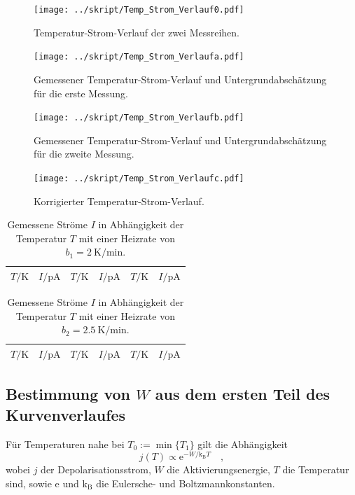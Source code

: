 \begin{figure}
\centering
\texttt{[image: ../skript/Temp\_Strom\_Verlauf0.pdf]}
\caption{Temperatur-Strom-Verlauf der zwei Messreihen.}
\label{fig:Verlauf}
\end{figure}




\begin{figure}[H]
\centering
\texttt{[image: ../skript/Temp\_Strom\_Verlaufa.pdf]}
\caption{Gemessener Temperatur-Strom-Verlauf und Untergrundabschätzung für die erste Messung.}
\label{fig:Messwertea}
\texttt{[image: ../skript/Temp\_Strom\_Verlaufb.pdf]}
\caption{Gemessener Temperatur-Strom-Verlauf und Untergrundabschätzung für die zweite Messung.}
\label{fig:Messwerteb}
\end{figure}
\begin{figure}
\centering
\texttt{[image: ../skript/Temp\_Strom\_Verlaufc.pdf]}
\caption{Korrigierter Temperatur-Strom-Verlauf.}
\label{fig:Messwertec}
\end{figure}

\begin{table}[htpb]
	\centering
	\begin{tabular}{cc|cc|cc}
		\midrule
		\midrule
		$T / \si{\kelvin}$ &
		$I / \si{\pA}$ &
		$T / \si{\kelvin}$ &
		$I / \si{\pA}$ &
		$T / \si{\kelvin}$ &
		$I / \si{\pA}$ \\
		\midrule
		
		\midrule
		\midrule
	\end{tabular}
	\caption{Gemessene Ströme $I$ in Abhängigkeit der Temperatur $T$ mit
		einer Heizrate von $b_1 = \SI{2}{\kelvin\per\minute}$.}
	\label{tab:tab1}
\end{table}
%
\begin{table}[htpb]
	\centering
	\begin{tabular}{cc|cc|cc}
		\midrule
		\midrule
		$T / \si{\kelvin}$ &
		$I / \si{\pA}$ &
		$T / \si{\kelvin}$ &
		$I / \si{\pA}$ &
		$T / \si{\kelvin}$ &
		$I / \si{\pA}$ \\
		\midrule
		
		\midrule
		\midrule
	\end{tabular}
	\caption{Gemessene Ströme $I$ in Abhängigkeit der Temperatur $T$ mit
		einer Heizrate von $b_2 = \SI{2.5}{\kelvin\per\minute}$.}
	\label{tab:tab2}
\end{table}
%
\subsection{Bestimmung von $W$ aus dem ersten Teil des Kurvenverlaufes}
Für Temperaturen nahe bei $T_0:=\min\{T_1\}$ gilt die Abhängigkeit
\begin{equation}
j(T)\propto \text{e}^{-W/\text{k}_\text{B}T} \quad ,
\end{equation}
wobei $j$ der Depolarisationsstrom, $W$ die Aktivierungsenergie, $T$ die
Temperatur sind, sowie $\text{e}$ und $\text{k}_\text{B}$ die Eulersche- und
Boltzmannkonstanten.

